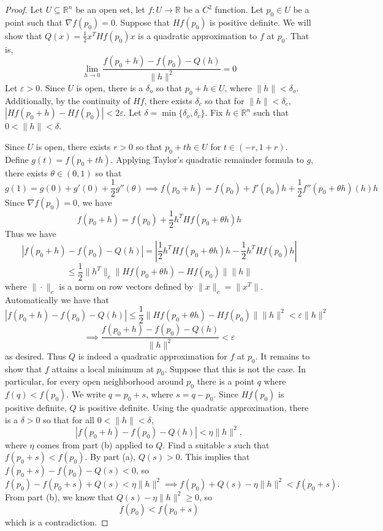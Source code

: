 \documentclass{article}
\theoremstyle{plain} %
\numberwithin{thm}{section} %
\theoremstyle{definition}
\begin{document}
\begin{proof}
            Let \(U \subseteq \mathbb{R}^n\) be an open set, let \(f: U \to \mathbb{R}\) be a \(C^2\) function. Let \(p_0 \in U\) be a point such that \(\nabla f(p_0) = 0\). Suppose that \(Hf(p_0)\) is positive definite. We will show that \(Q(x) = \frac{1}{2}x^T Hf(p_0) x\) is a quadratic approximation to \(f\) at \(p_0\). That is,
            \[
                \lim_{h \to 0} \frac{f(p_0 + h) - f(p_0) - Q(h)}{\|h\|^2} = 0
            \]
            Let \(\varepsilon > 0\). Since \(U\) is open, there is a \(\delta _o\) so that \(p_0 + h \in U\), where \(\|h\| < \delta _o\). Additionally, by the continuity of \(Hf\), there exists \(\delta _c\) so that for \(\|h\| < \delta _c\), \(|Hf(p_0 + h) - Hf(p_0)| < 2\varepsilon\). Let \(\delta = \min \{ \delta _o, \delta _c \}\). Fix \(h \in \mathbb{R}^n\) such that \(0 < \|h\| < \delta\).
            
            Since \(U\) is open, there exists \(r > 0\) so that \(p_0 + th \in U\) for \(t \in (-r, 1 + r)\). Define \(g(t) = f(p_0 + th)\).
            Applying Taylor's quadratic remainder formula to \(g\), there exists \(\theta \in (0, 1)\) so that
            \[
                g(1) = g(0) + g'(0) + \frac{1}{2}g''(\theta) \implies f(p_0 + h) = f(p_0) + f'(p_0)h + \frac{1}{2}f''(p_0 + \theta h)(h)h
            \]
            Since \(\nabla f(p_0) = 0\), we have
            \[
                f(p_0 + h) = f(p_0) + \frac{1}{2}h^T Hf(p_0 + \theta h)h
            \]
            Thus we have
            \[
                |f(p_0 + h) - f(p_0) - Q(h)| = \left\vert \frac{1}{2}h^T Hf(p_0 + \theta h)h - \frac{1}{2}h^T Hf(p_0)h\right\vert
            \]
            \[
                \leq \frac{1}{2}\|h^T\| _c \|Hf(p_0 + \theta h) - Hf(p_0)\| \|h\|
            \]
            where \(\|\cdot\| _c\) is a norm on row vectors defined by \(\|x\| _c = \|x^T\|\). Automatically we have that 
            \[
                |f(p_0 + h) - f(p_0) - Q(h)| \leq \frac{1}{2}\|Hf(p_0 + \theta h) - Hf(p_0)\| \|h\|^2 < \varepsilon \|h\|^2
            \]
            \[
                \implies \frac{f(p_0 + h) - f(p_0) - Q(h)}{\|h\|^2} < \varepsilon
            \]
            as desired. Thus \(Q\) is indeed a quadratic approximation for \(f\) at \(p_0\). It remains to show that \(f\) attains a local minimum at \(p_0\). Suppose that this is not the case. In particular, for every open neighborhood around \(p_0\) there is a point \(q\) where \(f(q) < f(p_0)\). We write \(q = p_0 + s\), where \(s = q - p_0\). Since \(Hf(p_0)\) is positive definite, \(Q\) is positive definite. Using the quadratic approximation, there is a \(\delta > 0\) so that for all \(0 < \|h\| < \delta\),
            \[
                |f(p_0 + h) - f(p_0) - Q(h)| < \eta\|h\|^2,
            \]
            where \(\eta\) comes from part (b) applied to \(Q\). Find a suitable \(s\) such that \(f(p_0 + s) < f(p_0)\). By part (a), \(Q(s) > 0\). This implies that \(f(p_0 + s) - f(p_0) - Q(s) < 0\), so
            \[
                f(p_0) - f(p_0 + s) + Q(s) < \eta \|h\|^2 \implies f(p_0) + Q(s) - \eta \|h\|^2 < f(p_0 + s).
            \]
            From part (b), we know that \(Q(s) - \eta \|h\|^2 \geq 0\), so
            \[
                f(p_0) < f(p_0 + s)
            \]
            which is a contradiction.
    

\end{proof}
\end{document}
